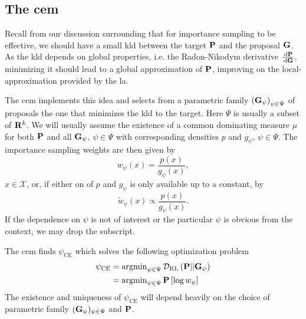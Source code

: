 \subsection{The \texorpdfstring{\Acrfull{cem}}{Cross-Entropy method}}
\label{subsec:cem}
Recall from our discussion surrounding  that for importance sampling to be effective, we should have a small \acrshort{kld} between the target $\P$ and the proposal $\G$. As the \acrshort{kld} depends on global properties, i.e. the Radon-Nikodym derivative $\rnd{\P}{\G}$, minimizing it should lead to a global approximation of $\P$, improving on the local-approximation provided by the \acrshort{la}.

The \gls{cem}\citep{Rubinstein1999CrossEntropy,Rubinstein2004CrossEntropy} implements this idea and selects from a parametric family $ \left( \G_{\psi} \right)_{\psi \in \Psi}$ of proposals the one that minimizes the \gls{kld} to the target. Here $\Psi$ is usually a subset of $\R^{k}$. We will usually assume the existence of a common dominating measure $\mu$ for both $\P$ and all $\G_{\psi}$, $\psi \in \Psi$ with corresponding densities $p$ and $g_{\psi}$, $\psi \in \Psi$. The importance sampling weights are then given by 
$$
w_{\psi}(x) = \frac{p(x)}{g_{\psi}(x)},
$$
$x \in \mathcal X$, or, if either on of $p$ and $g_\psi$ is only available up to a constant, by 
$$
\tilde w_{\psi} (x) \propto \frac{p(x)}{g_{\psi}(x)}.
$$
If the dependence on $\psi$ is not of interest or the particular $\psi$ is obvious from the context, we may drop the subscript. 

The \acrshort{cem} finds $\psi_{\text{CE}}$ which solves the following optimization problem
\begin{align*}
    \psi_{\text{CE}} &= \argmin_{\psi \in \Psi} \Dkl{\P}{\G_{\psi}} \\
    &= \argmin_{\psi \in \Psi} \P \left[ \log w_{\psi}\right]
\end{align*}
The existence and uniqueness of $\psi_{\text{CE}}$ will depend heavily on the choice of parametric family $(\G_{\psi})_{\psi \in \Psi}$ and $\P$. 

